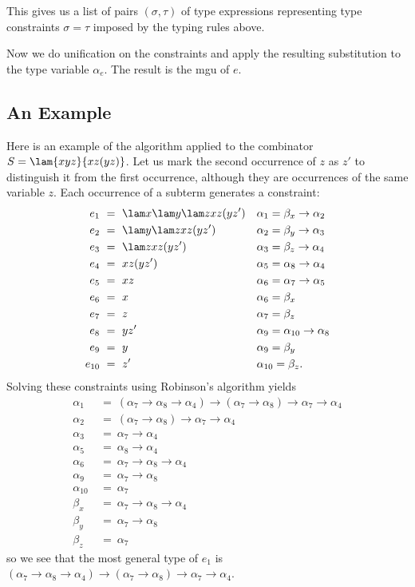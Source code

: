 This gives us a list of pairs $(\sigma,\tau)$ of type expressions representing type constraints $\sigma=\tau$ imposed by the typing rules above.

Now we do unification on the constraints and apply the resulting substitution to the type variable $\alpha_e$. The result is the mgu of $e$.

\subsection{An Example}

Here is an example of the algorithm applied to the combinator $S = \lam{xyz}{xz(yz)}$. Let us mark the second occurrence of $z$ as $z'$ to distinguish it from the first occurrence, although they are occurrences of the same variable $z$. Each occurrence of a subterm generates a constraint:
\begin{align*}
e_1\ &=\ \lam x{\lam y{\lam z{xz(yz')}}} && \alpha_1=\beta_x\to\alpha_2\\
e_2\ &=\ \lam y{\lam z{xz(yz')}} && \alpha_2=\beta_y\to\alpha_3\\
e_3\ &=\ \lam z{xz(yz')} && \alpha_3=\beta_z\to\alpha_4\\
e_4\ &=\ xz(yz') && \alpha_5=\alpha_8\to\alpha_4\\
e_5\ &=\ xz && \alpha_6=\alpha_7\to\alpha_5\\
e_6\ &=\ x && \alpha_6=\beta_x\\
e_7\ &=\ z && \alpha_7=\beta_z\\
e_8\ &=\ yz' && \alpha_9=\alpha_{10}\to\alpha_8\\
e_9\ &=\ y && \alpha_9=\beta_y\\
e_{10}\ &=\ z' && \alpha_{10}=\beta_z.
\end{align*}
Solving these constraints using Robinson's algorithm yields
\begin{align*}
\alpha_1\ &=\ (\alpha_7\to\alpha_8\to\alpha_4)\to(\alpha_7\to\alpha_8)\to\alpha_7\to\alpha_4\\
\alpha_2\ &=\ (\alpha_7\to\alpha_8)\to\alpha_7\to\alpha_4\\
\alpha_3\ &=\ \alpha_7\to\alpha_4\\
\alpha_5\ &=\ \alpha_8\to\alpha_4\\
\alpha_6\ &=\ \alpha_7\to\alpha_8\to\alpha_4\\
\alpha_9\ &=\ \alpha_7\to\alpha_8\\
\alpha_{10}\ &=\ \alpha_7\\
\beta_x\ &=\ \alpha_7\to\alpha_8\to\alpha_4\\
\beta_y\ &=\ \alpha_7\to\alpha_8\\
\beta_z\ &=\ \alpha_7
\end{align*}
so we see that the most general type of $e_1$ is $(\alpha_7\to\alpha_8\to\alpha_4)\to(\alpha_7\to\alpha_8)\to\alpha_7\to\alpha_4$.
